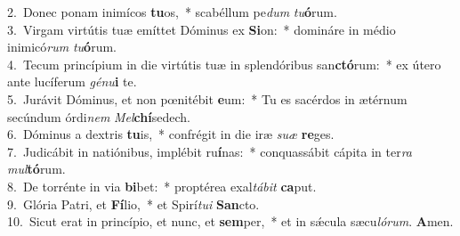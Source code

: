 {2.~}Donec ponam inimícos \textbf{tu}os,~* scabéllum pe\textit{dum} \textit{tu}\textbf{ó}rum.\\
{3.~}Virgam virtútis tuæ emíttet Dóminus ex \textbf{Si}on:~* domináre in médio inimicó\textit{rum} \textit{tu}\textbf{ó}rum.\\
{4.~}Tecum princípium in die virtútis tuæ in splendóribus san\textbf{ctó}rum:~* ex útero ante lucíferum \textit{gé}\textit{nu}\textbf{i} te.\\
{5.~}Jurávit Dóminus, et non pœnitébit \textbf{e}um:~* Tu es sacérdos in ætérnum secúndum órdi\textit{nem} \textit{Mel}\textbf{chí}sedech.\\
{6.~}Dóminus a dextris \textbf{tu}is,~* confrégit in die iræ \textit{su}\textit{æ} \textbf{re}ges.\\
{7.~}Judicábit in natiónibus, implébit ru\textbf{í}nas:~* conquassábit cápita in ter\textit{ra} \textit{mul}\textbf{tó}rum.\\
{8.~}De torrénte in via \textbf{bi}bet:~* proptérea exal\textit{tá}\textit{bit} \textbf{ca}put.\\
{9.~}Glória Patri, et \textbf{Fí}lio,~* et Spirí\textit{tu}\textit{i} \textbf{San}cto.\\
{10.~}Sicut erat in princípio, et nunc, et \textbf{sem}per,~* et in sǽcula sæcu\textit{ló}\textit{rum}. \textbf{A}men.\\
